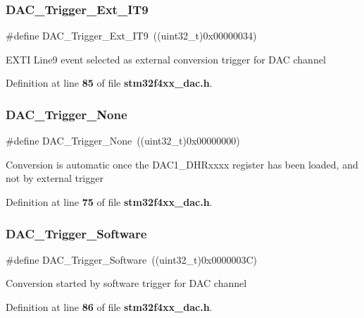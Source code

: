 \subsubsection{D\+A\+C\+\_\+\+Trigger\+\_\+\+Ext\+\_\+\+I\+T9}
{\footnotesize\ttfamily \#define D\+A\+C\+\_\+\+Trigger\+\_\+\+Ext\+\_\+\+I\+T9~((uint32\+\_\+t)0x00000034)}

E\+X\+TI Line9 event selected as external conversion trigger for D\+AC channel 

Definition at line \textbf{ 85} of file \textbf{ stm32f4xx\+\_\+dac.\+h}.

\mbox{\label{group__DAC__trigger__selection_ga7849138e043267668d755390d923e4ba}} 
\subsubsection{D\+A\+C\+\_\+\+Trigger\+\_\+\+None}
{\footnotesize\ttfamily \#define D\+A\+C\+\_\+\+Trigger\+\_\+\+None~((uint32\+\_\+t)0x00000000)}

Conversion is automatic once the D\+A\+C1\+\_\+\+D\+H\+Rxxxx register has been loaded, and not by external trigger 

Definition at line \textbf{ 75} of file \textbf{ stm32f4xx\+\_\+dac.\+h}.

\mbox{\label{group__DAC__trigger__selection_gadef77bb8bbd109232900902402ef637f}} 
\subsubsection{D\+A\+C\+\_\+\+Trigger\+\_\+\+Software}
{\footnotesize\ttfamily \#define D\+A\+C\+\_\+\+Trigger\+\_\+\+Software~((uint32\+\_\+t)0x0000003\+C)}

Conversion started by software trigger for D\+AC channel 

Definition at line \textbf{ 86} of file \textbf{ stm32f4xx\+\_\+dac.\+h}.

\mbox{\label{group__DAC__trigger__selection_ga3bfbff1e03af1fd17a57a43e57420fe6}} 
